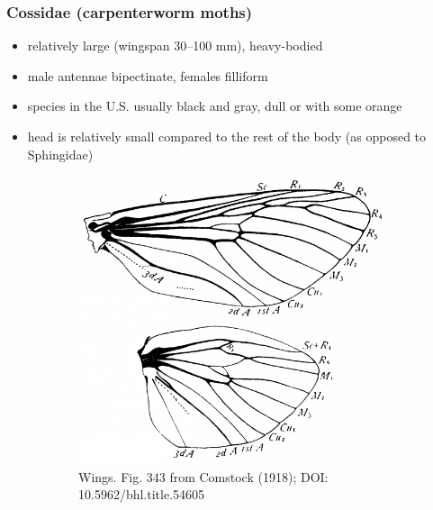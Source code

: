 \documentclass[letterpaper, 11pt]{article}
\begin{document}
\subsubsection{Cossidae (carpenterworm moths)}
\begin{itemize}
\item relatively large (wingspan 30--100 mm), heavy-bodied
\item male antennae bipectinate, females filliform
\item species in the U.S. usually black and gray, dull or with some orange
\item head is relatively small compared to the rest of the body (as opposed to Sphingidae)
\end{itemize}

\begin{figure}[ht!]
    \centering
    \begin{subfigure}[ht!]{0.38\textwidth}
        \includegraphics[width=\textwidth]{CossidWings}
        \caption{Wings. Fig. 343 from Comstock (1918); DOI: 10.5962/bhl.title.54605}
        \label{fig:cossid1}
    \end{subfigure}
    \qquad %
    \begin{subfigure}[ht!]{0.48\textwidth}

\end{subfigure}
\end{figure}
\end{document}
